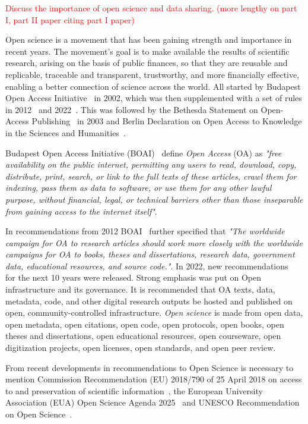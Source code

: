 \documentclass{article}
\begin{document}
\textcolor{red}{Discuss the importance of open science and data sharing. (more lengthy on part I, part II paper citing part I paper)}

Open science is a movement that has been gaining strength and importance in recent years.
The movement's goal is to make available the results of scientific research, arising on the basis of public finances, so that they are reusable and replicable, traceable and transparent, trustworthy, and more financially effective, enabling a better connection of science across the world.
All started by Budapest Open Access Initiative~\cite{2012_OSI} in 2002, which was then supplemented with a set of rules in 2012~\cite{2012_OSI} and 2022~\cite{2022_OSI}.  This was followed by the Bethesda Statement on Open-Access Publishing~\cite{2003_Bethesda} in 2003 and Berlin Declaration on Open Access to Knowledge in the Sciences and Humanities~\cite{2003_Max_Planck}.

Budapest Open Access Initiative (BOAI)~\cite{2002_OSI} define \textit{Open Access} (OA) as \textit{"free availability on the public internet, permitting any users to read, download, copy, distribute, print, search, or link to the full texts of these articles, crawl them for indexing, pass them as data to software, or use them for any other lawful purpose, without financial, legal, or technical barriers other than those inseparable from gaining access to the internet itself"}.

In recommendations from 2012 BOAI~\cite{2012_OSI} further specified that \textit{"The worldwide campaign for OA to research articles should work more closely with the worldwide campaigns for OA to books, theses and dissertations, research data, government data, educational resources, and source code."}. In 2022, new recommendations~\cite{2022_OSI} for the next 10 years were released. Strong emphasis was put on Open infrastructure and its governance. It is recommended that OA texts, data, metadata, code, and other digital research outputs be hosted and published on open, community-controlled infrastructure. \textit{Open science} is made from open data, open metadata, open citations, open code, open protocols, open books, open theses and dissertations, open educational resources, open courseware, open digitization projects, open licenses, open standards, and open peer review.

From recent developments in recommendations to Open Science is necessary to mention Commission Recommendation (EU) 2018/790 of 25 April 2018 on access to and preservation of scientific information~\cite{2018_EU_2018/790}, the European University Association (EUA) Open Science Agenda 2025~\cite{2022_EUA} and UNESCO Recommendation on Open Science~\cite{2021_UNESCO}.
\end{document}
